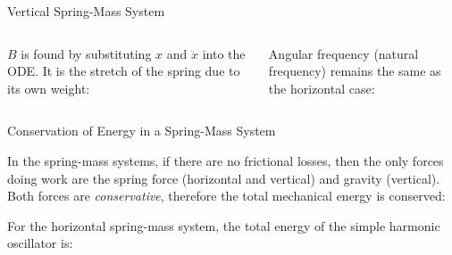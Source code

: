 \documentclass[12pt,compress,aspectratio=169]{beamer}
\begin{document}
\begin{frame}{Vertical Spring-Mass System}
  \begin{columns}

    $B$ is found by substituting $x$ and $\ddot x$ into the ODE. It is the
    stretch of the spring due to its own weight:
    

    Angular frequency (natural frequency) remains the same as the horizontal
    case:

  \end{columns}
\end{frame}



\begin{frame}{Conservation of Energy in a Spring-Mass System}

  In the spring-mass systems, if there are no frictional losses, then the only
  forces doing work are the spring force (horizontal and vertical) and gravity
  (vertical). Both forces are \emph{conservative}, therefore the total
  mechanical energy is conserved:

  
  For the horizontal spring-mass system, the total energy of the simple harmonic
  oscillator is:
    
\end{frame}
\end{document}
